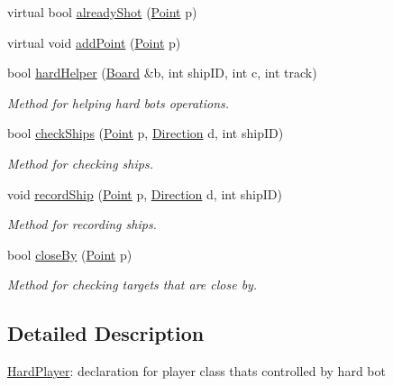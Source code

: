\begin{DoxyCompactItemize}
\item 
virtual bool \mbox{\hyperlink{class_hard_player_a8107a94c8db7d5f1023dbeeddfaaedb2}{already\+Shot}} (\mbox{\hyperlink{class_point}{Point}} p)
\item 
virtual void \mbox{\hyperlink{class_hard_player_a77c82c1a36c9e956fdab98837ed888e5}{add\+Point}} (\mbox{\hyperlink{class_point}{Point}} p)
\item 
bool \mbox{\hyperlink{class_hard_player_aec6ff0ed3ef8f47ac46d374cff89e6be}{hard\+Helper}} (\mbox{\hyperlink{class_board}{Board}} \&b, int ship\+ID, int c, int track)
\begin{DoxyCompactList}\small\item\em Method for helping hard bot\textquotesingle{}s operations. \end{DoxyCompactList}\item 
bool \mbox{\hyperlink{class_hard_player_aebad1f5ad6f9ac20eb4f1ca639088c7b}{check\+Ships}} (\mbox{\hyperlink{class_point}{Point}} p, \mbox{\hyperlink{_globals_8h_a224b9163917ac32fc95a60d8c1eec3aa}{Direction}} d, int ship\+ID)
\begin{DoxyCompactList}\small\item\em Method for checking ships. \end{DoxyCompactList}\item 
void \mbox{\hyperlink{class_hard_player_a9358a28f7f0e618d3c98aba7b135e6a8}{record\+Ship}} (\mbox{\hyperlink{class_point}{Point}} p, \mbox{\hyperlink{_globals_8h_a224b9163917ac32fc95a60d8c1eec3aa}{Direction}} d, int ship\+ID)
\begin{DoxyCompactList}\small\item\em Method for recording ships. \end{DoxyCompactList}\item 
bool \mbox{\hyperlink{class_hard_player_a91cdd6239e111ea02bff561f6a3a0c41}{close\+By}} (\mbox{\hyperlink{class_point}{Point}} p)
\begin{DoxyCompactList}\small\item\em Method for checking target\textquotesingle{}s that are close by. \end{DoxyCompactList}\end{DoxyCompactItemize}


\subsection{Detailed Description}
\mbox{\hyperlink{class_hard_player}{Hard\+Player}}\+: declaration for player class that\textquotesingle{}s controlled by hard bot 

